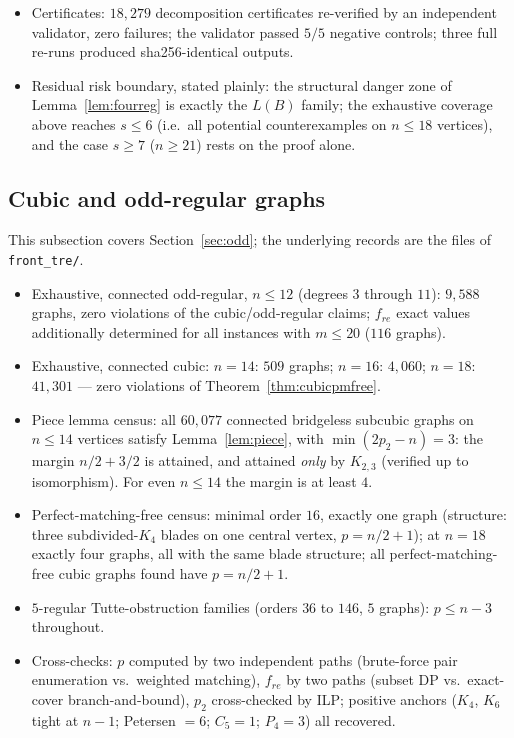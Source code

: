 \documentclass[a4paper,11pt]{amsart}
\theoremstyle{definition}
\theoremstyle{remark}
\begin{document}
\begin{itemize}
double triangle-freeness checks, all pass.
\item Certificates: $18{,}279$ decomposition certificates re-verified by an independent validator, zero
failures; the validator passed $5/5$ negative controls; three full re-runs produced sha256-identical
outputs.
\item Residual risk boundary, stated plainly: the structural danger zone of
Lemma~\ref{lem:fourreg} is exactly the $L(B)$ family; the exhaustive coverage above reaches $s\le6$
(i.e.\ all potential counterexamples on $n\le18$ vertices), and the case $s\ge7$ ($n\ge21$) rests on the
proof alone.
\end{itemize}

\subsection*{Cubic and odd-regular graphs}

This subsection covers Section~\ref{sec:odd}; the underlying records are the files of
\texttt{front\_tre/}.

\begin{itemize}
\item Exhaustive, connected odd-regular, $n\le12$ (degrees $3$ through $11$): $9{,}588$ graphs, zero
violations of the cubic/odd-regular claims; $f_{re}$ exact values additionally determined for all
instances with $m\le20$ ($116$ graphs).
\item Exhaustive, connected cubic: $n=14$: $509$ graphs; $n=16$: $4{,}060$; $n=18$: $41{,}301$ --- zero
violations of Theorem~\ref{thm:cubicpmfree}.
\item Piece lemma census: all $60{,}077$ connected bridgeless subcubic graphs on $n\le14$ vertices satisfy
Lemma~\ref{lem:piece}, with $\min(2p_2-n)=3$: the margin $n/2+3/2$ is attained, and attained
\emph{only} by $K_{2,3}$ (verified up to isomorphism). For even $n\le14$ the margin is at least $4$.
\item Perfect-matching-free census: minimal order $16$, exactly one graph (structure: three
subdivided-$K_4$ blades on one central vertex, $p=n/2+1$); at $n=18$ exactly four graphs, all with the
same blade structure; all perfect-matching-free cubic graphs found have $p=n/2+1$.
\item $5$-regular Tutte-obstruction families (orders $36$ to $146$, $5$ graphs): $p\le n-3$ throughout.
\item Cross-checks: $p$ computed by two independent paths (brute-force pair enumeration vs.\ weighted
matching), $f_{re}$ by two paths (subset DP vs.\ exact-cover branch-and-bound), $p_2$ cross-checked by
ILP; positive anchors ($K_4$, $K_6$ tight at $n-1$; Petersen $=6$; $C_5=1$; $P_4=3$) all recovered.
\end{itemize}
\end{document}
